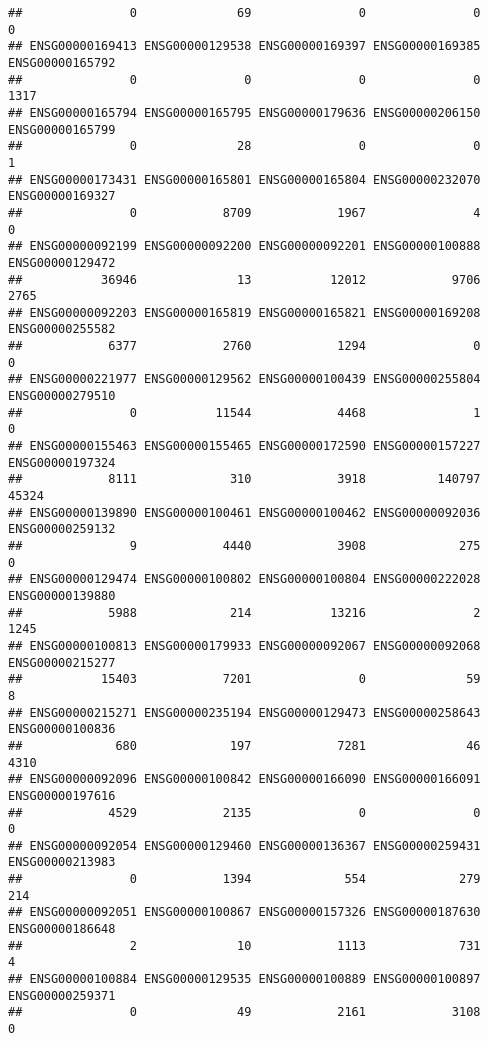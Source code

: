 \documentclass[
]{article}
\begin{document}
\begin{verbatim}
##               0              69               0               0               0 
## ENSG00000169413 ENSG00000129538 ENSG00000169397 ENSG00000169385 ENSG00000165792 
##               0               0               0               0            1317 
## ENSG00000165794 ENSG00000165795 ENSG00000179636 ENSG00000206150 ENSG00000165799 
##               0              28               0               0               1 
## ENSG00000173431 ENSG00000165801 ENSG00000165804 ENSG00000232070 ENSG00000169327 
##               0            8709            1967               4               0 
## ENSG00000092199 ENSG00000092200 ENSG00000092201 ENSG00000100888 ENSG00000129472 
##           36946              13           12012            9706            2765 
## ENSG00000092203 ENSG00000165819 ENSG00000165821 ENSG00000169208 ENSG00000255582 
##            6377            2760            1294               0               0 
## ENSG00000221977 ENSG00000129562 ENSG00000100439 ENSG00000255804 ENSG00000279510 
##               0           11544            4468               1               0 
## ENSG00000155463 ENSG00000155465 ENSG00000172590 ENSG00000157227 ENSG00000197324 
##            8111             310            3918          140797           45324 
## ENSG00000139890 ENSG00000100461 ENSG00000100462 ENSG00000092036 ENSG00000259132 
##               9            4440            3908             275               0 
## ENSG00000129474 ENSG00000100802 ENSG00000100804 ENSG00000222028 ENSG00000139880 
##            5988             214           13216               2            1245 
## ENSG00000100813 ENSG00000179933 ENSG00000092067 ENSG00000092068 ENSG00000215277 
##           15403            7201               0              59               8 
## ENSG00000215271 ENSG00000235194 ENSG00000129473 ENSG00000258643 ENSG00000100836 
##             680             197            7281              46            4310 
## ENSG00000092096 ENSG00000100842 ENSG00000166090 ENSG00000166091 ENSG00000197616 
##            4529            2135               0               0               0 
## ENSG00000092054 ENSG00000129460 ENSG00000136367 ENSG00000259431 ENSG00000213983 
##               0            1394             554             279             214 
## ENSG00000092051 ENSG00000100867 ENSG00000157326 ENSG00000187630 ENSG00000186648 
##               2              10            1113             731               4 
## ENSG00000100884 ENSG00000129535 ENSG00000100889 ENSG00000100897 ENSG00000259371 
##               0              49            2161            3108               0 

\end{verbatim}
\end{document}
